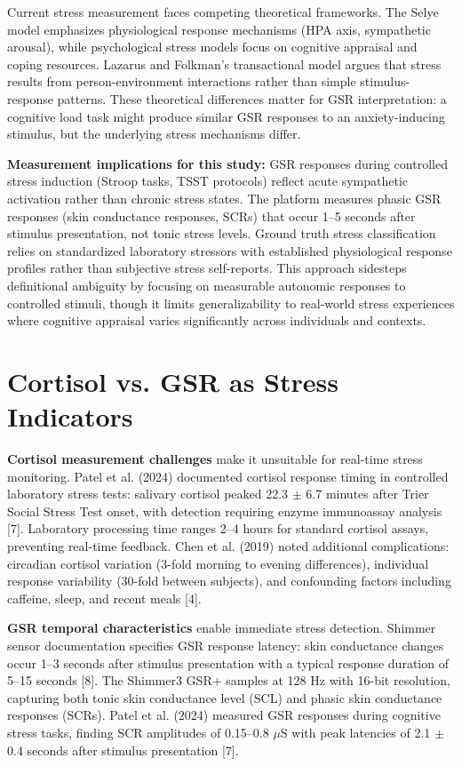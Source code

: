 Current stress measurement faces competing theoretical frameworks. The Selye model emphasizes physiological response mechanisms (HPA axis, sympathetic arousal), while psychological stress models focus on cognitive appraisal and coping resources. Lazarus and Folkman's transactional model argues that stress results from person-environment interactions rather than simple stimulus-response patterns. These theoretical differences matter for GSR interpretation: a cognitive load task might produce similar GSR responses to an anxiety-inducing stimulus, but the underlying stress mechanisms differ.

\textbf{Measurement implications for this study:} GSR responses during controlled stress induction (Stroop tasks, TSST protocols) reflect acute sympathetic activation rather than chronic stress states. The platform measures phasic GSR responses (skin conductance responses, SCRs) that occur 1--5 seconds after stimulus presentation, not tonic stress levels. Ground truth stress classification relies on standardized laboratory stressors with established physiological response profiles rather than subjective stress self-reports. This approach sidesteps definitional ambiguity by focusing on measurable autonomic responses to controlled stimuli, though it limits generalizability to real-world stress experiences where cognitive appraisal varies significantly across individuals and contexts.

\section{Cortisol vs. GSR as Stress Indicators}
\textbf{Cortisol measurement challenges} make it unsuitable for real-time stress monitoring. Patel et al. (2024) documented cortisol response timing in controlled laboratory stress tests: salivary cortisol peaked 22.3 $\pm$ 6.7 minutes after Trier Social Stress Test onset, with detection requiring enzyme immunoassay analysis [7]. Laboratory processing time ranges 2--4 hours for standard cortisol assays, preventing real-time feedback. Chen et al. (2019) noted additional complications: circadian cortisol variation (3-fold morning to evening differences), individual response variability (30-fold between subjects), and confounding factors including caffeine, sleep, and recent meals [4].

\textbf{GSR temporal characteristics} enable immediate stress detection. Shimmer sensor documentation specifies GSR response latency: skin conductance changes occur 1--3 seconds after stimulus presentation with a typical response duration of 5--15 seconds [8]. The Shimmer3 GSR+ samples at 128 Hz with 16-bit resolution, capturing both tonic skin conductance level (SCL) and phasic skin conductance responses (SCRs). Patel et al. (2024) measured GSR responses during cognitive stress tasks, finding SCR amplitudes of 0.15--0.8 $\mu$S with peak latencies of 2.1 $\pm$ 0.4 seconds after stimulus presentation [7].


